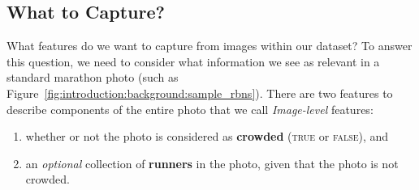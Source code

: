 \subsection{What to Capture?}
\label{sec:dataset:architecture:what_to_capture}

What features do we want to capture from images within our dataset? To answer this question, we need to consider what information we see as relevant in a standard marathon photo (such as Figure~\ref{fig:introduction:background:sample_rbns}). There are two features to describe components of the entire photo that we call \textit{Image-level} features:

\begin{enumerate}
  \item whether or not the photo is considered as \textbf{crowded} (\textsc{true} or \textsc{false}), and
  \item an \textit{optional} collection of \textbf{runners} in the photo, given that the photo is not crowded.
\end{enumerate}

